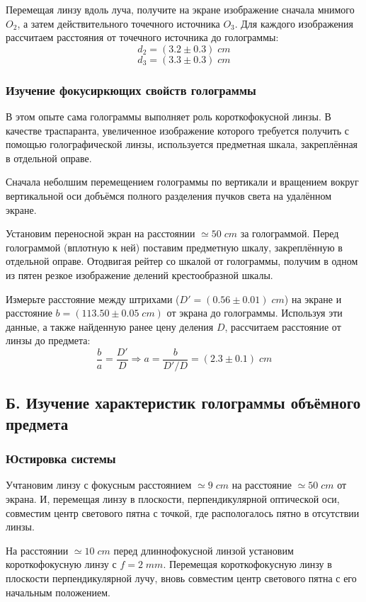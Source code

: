 \documentclass{article}
\begin{document}
Перемещая линзу вдоль луча, получите на экране изображение сначала мнимого \(O_2\), а затем действительного точечного
источника \(O_3\). Для каждого изображения рассчитаем расстояния от точечного источника до голограммы:
\[ d_2 = (3.2 \pm 0.3)\; cm \]
\[ d_3 = (3.3 \pm 0.3)\; cm \]

\subsubsection{Изучение фокусиркющих свойств голограммы}
В этом опыте сама голограммы выполняет роль короткофокусной линзы. В качестве траспаранта, увеличенное изображение которого
требуется получить с помощью голографической линзы, используется предметная шкала, закреплённая в отдельной оправе.

Сначала неболшим перемещением голограммы по вертикали и вращением вокруг вертикальной оси добъёмся полного разделения пучков света
на удалённом экране. 

Установим переносной экран на расстоянии \(\simeq 50\; cm\) за голограммой. Перед голограммой (вплотную к ней)
поставим предметную шкалу, закреплённую в отдельной оправе. Отодвигая рейтер со шкалой от голограммы,
получим в одном из пятен резкое изображение делений крестообразной шкалы.

Измерьте расстояние между штрихами (\(D' = (0.56\pm0.01)\; cm\)) на экране и расстояние \(b = (113.50 \pm 0.05\; cm)\) от экрана до голограммы.
Используя эти данные, а также найденную ранее цену деления \(D\), рассчитаем расстояние от линзы до предмета:
\[\frac{b}{a} = \frac{D'}{D} \Rightarrow a = \frac{b}{D'/D} = (2.3\pm0.1)\;cm\]

\subsection{Б. Изучение характеристик голограммы объёмного предмета}
\subsubsection{Юстировка системы}
Учтановим линзу с фокусным расстоянием \(\simeq 9\;cm\) на расстояние \(\simeq 50\; cm\) от экрана. И, перемещая линзу
в плоскости, перпендикулярной оптической оси, совместим центр светового пятна с точкой, где распологалось пятно в отсутствии линзы.

На расстоянии \(\simeq 10\;cm\) перед длиннофокусной линзой установим короткофокусную линзу с \(f = 2\;mm\). Перемещая короткофокусную
линзу в плоскости перпендикулярной лучу, вновь совместим центр светового пятна с его начальным положением.
\end{document}
